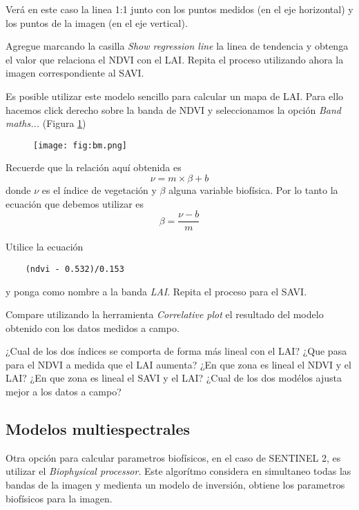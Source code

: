 Verá en este caso la linea 1:1 junto con los puntos medidos (en el eje horizontal) y los puntos de la imagen (en el eje vertical).

Agregue marcando la casilla \emph{Show regression line} la linea de tendencia y obtenga el valor que relaciona el NDVI con el LAI. Repita el proceso utilizando ahora la imagen correspondiente al SAVI.

Es posible utilizar este modelo sencillo para calcular un mapa de LAI. Para ello hacemos click derecho sobre la banda de NDVI y seleccionamos la opción \emph{Band maths...} (Figura \ref{fig:bm})

\begin{figure}[h!]
    \centering
    \texttt{[image: fig:bm.png]}
    \caption{}
    \label{fig:bm}
\end{figure}

Recuerde que la relación aquí obtenida es
\begin{equation}
    \nu = m \times \beta + b
\end{equation}
donde $\nu$ es el índice de vegetación y $\beta$ alguna variable biofísica. Por lo tanto la ecuación que debemos utilizar es
\begin{equation}
    \beta = \frac{\nu - b}{m}
\end{equation}

Utilice la ecuación

\begin{verbatim}
    (ndvi - 0.532)/0.153
\end{verbatim}

y ponga como nombre a la banda \emph{LAI}. Repita el proceso para el SAVI.

Compare utilizando la herramienta \emph{Correlative plot} el resultado del modelo obtenido con los datos medidos a campo.

\begin{que}
    ¿Cual de los dos índices se comporta de forma más lineal con el LAI? ¿Que pasa para el NDVI a medida que el LAI aumenta? ¿En que zona es lineal el NDVI y el LAI? ¿En que zona es lineal el SAVI y el LAI? ¿Cual de los dos modélos ajusta mejor a los datos a campo?
\end{que}

\subsection{Modelos multiespectrales}

Otra opción para calcular parametros biofísicos, en el caso de SENTINEL 2, es utilizar el \emph{Biophysical processor}. Este algorítmo considera en simultaneo todas las bandas de la imagen y medienta un modelo de inversión, obtiene los parametros biofísicos para la imagen.

